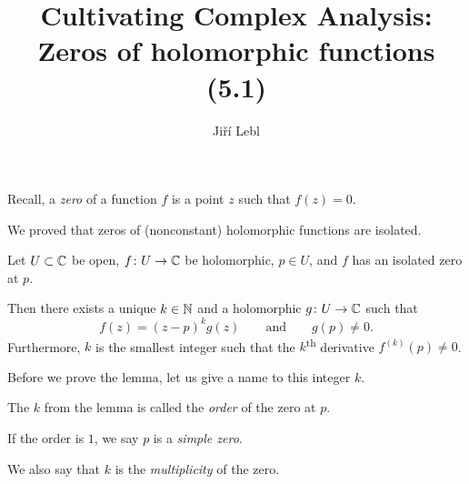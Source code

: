 \documentclass[10pt,aspectratio=169]{beamer}
\author{Ji\v{r}\'i Lebl}
\institute[OSU]{%
Departemento pri Matematiko de Oklahoma {\^S}tata Universitato}
\title{Cultivating Complex Analysis:\\%
Zeros of holomorphic functions (5.1)}
\date{}
\begin{document}
\begin{frame}
\titlepage
\end{frame}

\begin{frame}
Recall, a \emph{zero} of a function $f$ is a point $z$ such that $f(z) = 0$.

\medskip
\pause

We proved that zeros of (nonconstant) holomorphic functions are isolated.
\pause

\begin{lemma}
Let $U \subset {\mathbb{C}}$ be open, $f \colon U \to {\mathbb{C}}$ be holomorphic, $p \in U$,
and $f$ has an isolated zero at $p$.

\pause
Then there exists a unique $k \in {\mathbb{N}}$ and a holomorphic $g \colon U
\to {\mathbb{C}}$ such that
\[
f(z) = {(z-p)}^k g(z)
\qquad
\text{and} \qquad
g(p) \not= 0 .
\]
\pause
Furthermore, $k$ is the smallest integer such that the $k$\textsuperscript{th}
derivative $f^{(k)}(p) \not= 0$.
\end{lemma}

\pause

Before we prove the lemma, let us give a name to this integer $k$.

\begin{definition}
The $k$ from the lemma is called the \emph{order}
of the zero at $p$.
\pause

If the order is $1$, we say $p$ is a \emph{simple zero}.

\pause

We also say that $k$ is the \emph{multiplicity} of the zero.
\end{definition}
\end{frame}
\end{document}
